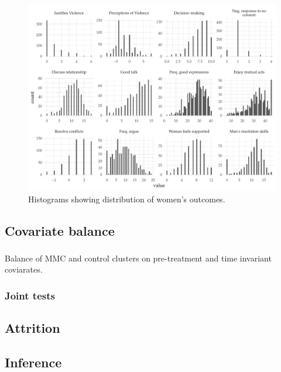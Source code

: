 \documentclass[11pt,english]{article}
\begin{document}
\begin{figure}[H]
\centering
\includegraphics[width = \textwidth]{figures/distribution_womens.pdf}
\caption{Histograms showing distribution of women's outcomes.}
\label{fig:dist_womens}
\end{figure}

\subsection{Covariate balance}

\subsubsection{}

\begin{table}[H]
\centering

\caption{Balance of MMC and control clusters on pre-treatment and time invariant coviarates.}
\label{tab:balance_results}
\end{table}

\subsubsection{Joint tests}


\subsection{Attrition}

\subsection{Inference}
\end{document}
